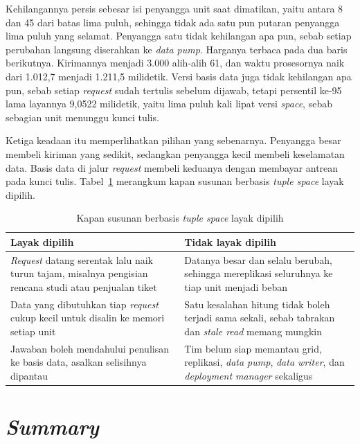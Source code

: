 Kehilangannya persis sebesar isi penyangga unit saat dimatikan, yaitu antara 8
dan 45 dari batas lima puluh, sehingga tidak ada satu pun putaran penyangga
lima puluh yang selamat. Penyangga satu tidak kehilangan apa pun, sebab setiap
perubahan langsung diserahkan ke \textit{data pump}. Harganya terbaca pada dua
baris berikutnya. Kirimannya menjadi 3.000 alih-alih 61, dan waktu
prosesornya naik dari 1.012,7 menjadi 1.211,5 milidetik. Versi basis data juga
tidak kehilangan apa pun, sebab setiap \textit{request} sudah tertulis sebelum
dijawab, tetapi persentil ke-95 lama layannya 9,0522 milidetik,
yaitu lima
puluh kali lipat versi \textit{space}, sebab sebagian unit menunggu kunci tulis.

Ketiga keadaan itu memperlihatkan pilihan yang sebenarnya. Penyangga besar
membeli kiriman yang sedikit, sedangkan penyangga kecil membeli keselamatan
data. Basis data di jalur \textit{request} membeli keduanya dengan membayar
antrean pada kunci tulis. Tabel~\ref{tab:kapan-ruang} merangkum kapan susunan
berbasis \textit{tuple space} layak dipilih.

\begin{table}[htbp]
  \centering
  \caption{Kapan susunan berbasis \textit{tuple space} layak dipilih}
  \label{tab:kapan-ruang}
  \begin{tabularx}{\textwidth}{|X|X|}
    \hline
    \textbf{Layak dipilih} & \textbf{Tidak layak dipilih} \\
    \hline
    \textit{Request} datang serentak lalu naik turun tajam, misalnya pengisian rencana studi atau penjualan tiket & Datanya besar dan selalu berubah, sehingga mereplikasi seluruhnya ke tiap unit menjadi beban \\
    \hline
    Data yang dibutuhkan tiap \textit{request} cukup kecil untuk disalin ke memori setiap unit & Satu kesalahan hitung tidak boleh terjadi sama sekali, sebab tabrakan dan \textit{stale read} memang mungkin \\
    \hline
    Jawaban boleh mendahului penulisan ke basis data, asalkan selisihnya dipantau & Tim belum siap memantau grid, replikasi, \textit{data pump}, \textit{data writer}, dan \textit{deployment manager} sekaligus \\
    \hline
  \end{tabularx}
\end{table}

\section{\textit{Summary}}

